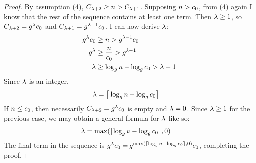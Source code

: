 \begin{proof}
	By assumption (4), $C_{\lambda + 2} \geq n > C_{\lambda + 1}$. Supposing $n > c_0$, from (4) again I know that the rest of the sequence contains at least one term. Then $\lambda \geq 1$, so $C_{\lambda + 2} = g^\lambda c_0$ and $C_{\lambda + 1} = g^{\lambda - 1}c_0$. I can now derive $\lambda$:
	\begin{align*}
	g^\lambda c_0 &\geq n > g^{\lambda - 1}c_0\\
	g^\lambda &\geq \frac{n}{c_0} > g^{\lambda - 1}\\
	\lambda &\geq \log_{g} n - \log_{g} c_0 > \lambda - 1\\
	\end{align*}
	Since $\lambda$ is an integer,
	\begin{align*}
	\lambda &= \big\lceil \log_{g} n - \log_{g} c_0 \big\rceil
	\end{align*}
	If $n \leq c_0$, then necessarily $C_{\lambda + 2} = g^\lambda c_0$ is empty and $\lambda = 0$. Since $\lambda \geq 1$ for the previous case, we may obtain a general formula for $\lambda$ like so:
	\begin{align*}
	\lambda &= \max(\lceil \log_{g} n - \log_{g} c_0 \rceil, 0)
	\end{align*}
	The final term in the sequence is $g^\lambda c_0 = g^{\max(\lceil \log_{g} n - \log_{g} c_0 \rceil, 0)}c_0$, completing the proof.
\end{proof}

